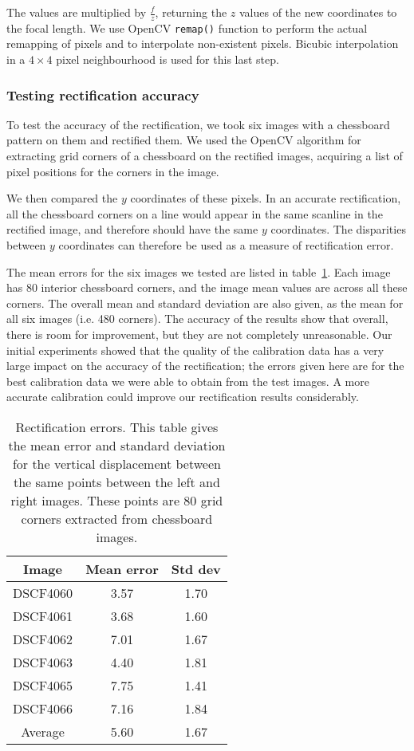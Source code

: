 The values are multiplied by $\frac{f}{z}$, returning the $z$ values of the new coordinates to the focal length. We use OpenCV \texttt{remap()} function to perform the actual remapping of pixels and to
interpolate non-existent pixels. Bicubic interpolation in a $4\times4$ pixel neighbourhood
is used for this last step.

\subsubsection{Testing rectification accuracy}
To test the accuracy of the rectification, we took six images with a chessboard pattern on them and rectified them. We used the OpenCV algorithm for extracting grid corners of a chessboard on the rectified images, acquiring a list of pixel positions for the corners in the image.

We then compared the $y$ coordinates of these pixels. In an accurate rectification, all the chessboard corners on a line would appear in the same scanline in the rectified image, and therefore should have the same $y$ coordinates. The disparities between $y$ coordinates can therefore be used as a measure of rectification error.

The mean errors for the six images we tested are listed in
table~\ref{tab:rectification-error}. Each image has 80 interior chessboard corners, and the image mean values are across all these corners. The overall
mean and standard deviation are also given, as the mean for all six images (i.e.
480 corners). The accuracy of the results show that overall, there is room for improvement, but they are not completely unreasonable. Our initial experiments showed that
the quality of the calibration data has a very large impact on the accuracy of the
rectification; the errors given here are for the best calibration data we were
able to obtain from the test images. A more accurate calibration could improve our rectification results considerably.

\begin{table}[h]
  \centering
  \begin{tabular}{c c c}
    \toprule
    Image & Mean error & Std dev \\
    \midrule
    DSCF4060 & 3.57  & 1.70 \\
    DSCF4061 & 3.68  & 1.60 \\
    DSCF4062 & 7.01  & 1.67 \\
    DSCF4063 & 4.40  & 1.81 \\
    DSCF4065 & 7.75  & 1.41 \\
    DSCF4066 & 7.16  & 1.84 \\
    \midrule
    Average  & 5.60  & 1.67 \\
    \bottomrule
  \end{tabular}
  \caption[Rectification errors]{Rectification errors. This table gives the mean error and
    standard deviation for the vertical displacement between the same points
    between the left and right images. These points are 80 grid corners extracted from chessboard images.}
  \label{tab:rectification-error}
\end{table}

